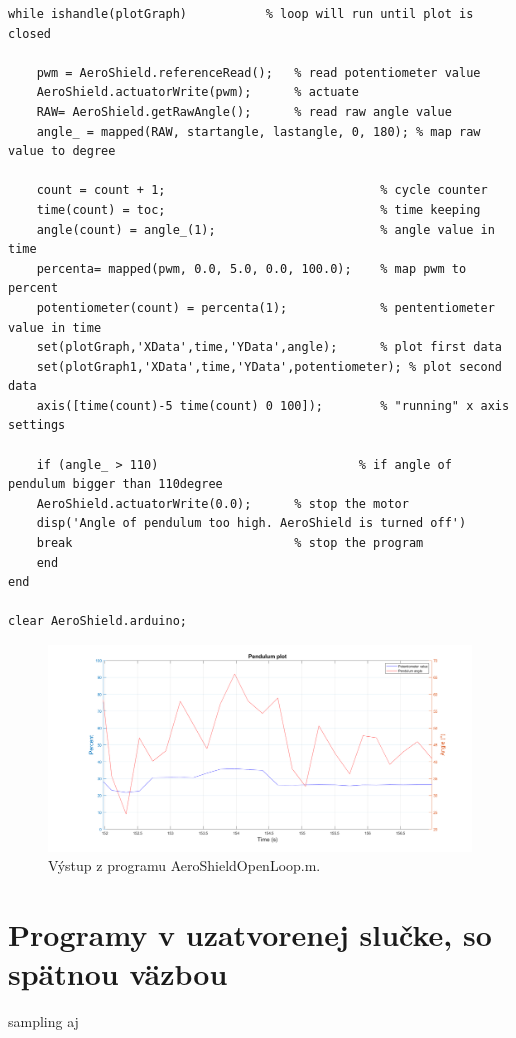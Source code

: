\begin{lstlisting}[caption={AeroShield open loop, while cyklus.},captionpos=b]
while ishandle(plotGraph)           % loop will run until plot is closed
	
	pwm = AeroShield.referenceRead();   % read potentiometer value
	AeroShield.actuatorWrite(pwm);      % actuate 
	RAW= AeroShield.getRawAngle();      % read raw angle value
	angle_ = mapped(RAW, startangle, lastangle, 0, 180); % map raw value to degree 
	
	count = count + 1;                              % cycle counter
	time(count) = toc;                              % time keeping
	angle(count) = angle_(1);                       % angle value in time
	percenta= mapped(pwm, 0.0, 5.0, 0.0, 100.0);    % map pwm to percent 
	potentiometer(count) = percenta(1);             % pententiometer value in time
	set(plotGraph,'XData',time,'YData',angle);      % plot first data 
	set(plotGraph1,'XData',time,'YData',potentiometer); % plot second data 
	axis([time(count)-5 time(count) 0 100]);        % "running" x axis settings
	
	if (angle_ > 110)                            % if angle of pendulum bigger than 110degree
	AeroShield.actuatorWrite(0.0);      % stop the motor 
	disp('Angle of pendulum too high. AeroShield is turned off')
	break                               % stop the program
	end
end  

clear AeroShield.arduino;           
\end{lstlisting}

\begin{figure}[!tbh]
	\centering
	\includegraphics[width=\textwidth]{obr/ASOLmat.png}
	\caption{Výstup z programu AeroShieldOpenLoop.m.}\label{OBRAZOK 3.2}
\end{figure}

\section{Programy v uzatvorenej slučke, so spätnou väzbou}

sampling aj